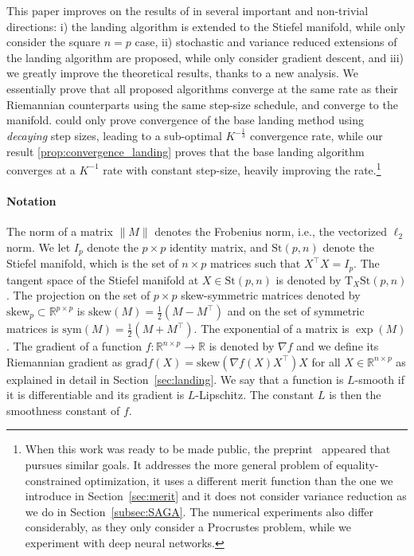 \documentclass[twoside,11pt]{article}
\newcommand{\grad}{{\mathrm{grad}}}
\newcommand{\stiefel}{{\mathrm{St}(p, n)}}
\newcommand{\sk}{{\mathrm{skew}}}
\newcommand{\sym}{{\mathrm{sym}}}
\newcommand{\tangent}{{\mathrm{T}_X\stiefel}}
\newcommand{\bR}{\mathbb{R}}    %
\newcommand{\Lc}{L} %
\newcommand{\revision}[1]{{#1}}
\begin{document}
\revision{This paper improves on the results of \cite{ablin2022fast} in several important and non-trivial directions: i) the landing algorithm is extended to the Stiefel manifold, while \cite{ablin2022fast} only consider the square $n=p$ case, ii) stochastic and variance reduced extensions of the landing algorithm are proposed, while \cite{ablin2022fast} only consider gradient descent, and iii) we greatly improve the theoretical results, thanks to a new analysis. We essentially prove that all proposed algorithms converge at the same rate as their Riemannian counterparts using the same step-size schedule, and converge to the manifold. \cite{ablin2022fast} could only prove convergence of the base landing method using \emph{decaying} step sizes, leading to a sub-optimal $K^{-\frac13}$ convergence rate, while our result \autoref{prop:convergence_landing} proves that the base landing algorithm converges at a $K^{-1}$ rate with constant step-size, heavily improving the rate.}\footnote{When this work was ready to be made public, the preprint~\citep{schechtman2023orthogonal} appeared that pursues similar goals. It addresses the more general problem of equality-constrained optimization, it uses a different merit function than the one we introduce in Section~\ref{sec:merit} and it does not consider variance reduction as we do in Section~\ref{subsec:SAGA}. The numerical experiments also differ considerably, as they only consider a Procrustes problem, while we experiment with deep neural networks.}
%
%
%
%
%
%
%
%
%
%


%


%
\paragraph{Notation} The norm of a matrix $\|M\|$ denotes the Frobenius norm, i.e., the vectorized $\ell_2$ norm. We let $I_p$ denote the $p\times p$ identity matrix, and $\stiefel$ denote the Stiefel manifold, which is the set of $n\times p$ matrices such that $X^\top X = I_p$. The tangent space of the Stiefel manifold at $X\in \stiefel$ is denoted by $\tangent$. The projection on the set of $p \times p$ skew-symmetric matrices denoted by $\sk_p\subset \bR^{p\times p}$ is $\sk(M) = \frac12(M - M^\top)$ and on the set of symmetric matrices is $\sym(M) = \frac12(M + M^\top)$. The exponential of a matrix is $\exp(M)$. The gradient of a function $f:\mathbb{R}^{n\times p}\to \mathbb{R}$ is denoted by $\nabla f$ and we define its Riemannian gradient as $\grad f(X) = \sk(\nabla f(X)X^\top)X$ for all $X\in\mathbb{R}^{n\times p}$ as explained in detail in Section~\ref{sec:landing}. We say that a function is $\Lc$-smooth if it is differentiable and its gradient is $\Lc$-Lipschitz. The constant $\Lc$ is then the smoothness constant of $f$.
\end{document}
